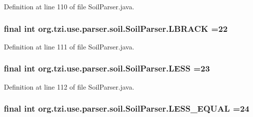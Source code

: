 Definition at line 110 of file Soil\-Parser.\-java.

\hypertarget{classorg_1_1tzi_1_1use_1_1parser_1_1soil_1_1_soil_parser_a7dc5102c33cc1a06d0bba2690db2d42c}{
\subsubsection[{L\-B\-R\-A\-C\-K}]{\setlength{\rightskip}{0pt plus 5cm}final int org.\-tzi.\-use.\-parser.\-soil.\-Soil\-Parser.\-L\-B\-R\-A\-C\-K =22\hspace{0.3cm}{\ttfamily [static]}}}\label{classorg_1_1tzi_1_1use_1_1parser_1_1soil_1_1_soil_parser_a7dc5102c33cc1a06d0bba2690db2d42c}


Definition at line 111 of file Soil\-Parser.\-java.

\hypertarget{classorg_1_1tzi_1_1use_1_1parser_1_1soil_1_1_soil_parser_aedcc44340367e46c0113e5c912cc1c31}{
\subsubsection[{L\-E\-S\-S}]{\setlength{\rightskip}{0pt plus 5cm}final int org.\-tzi.\-use.\-parser.\-soil.\-Soil\-Parser.\-L\-E\-S\-S =23\hspace{0.3cm}{\ttfamily [static]}}}\label{classorg_1_1tzi_1_1use_1_1parser_1_1soil_1_1_soil_parser_aedcc44340367e46c0113e5c912cc1c31}


Definition at line 112 of file Soil\-Parser.\-java.

\hypertarget{classorg_1_1tzi_1_1use_1_1parser_1_1soil_1_1_soil_parser_a9a66b349a665b8dbd65a7855f286718c}{
\subsubsection[{L\-E\-S\-S\-\_\-\-E\-Q\-U\-A\-L}]{\setlength{\rightskip}{0pt plus 5cm}final int org.\-tzi.\-use.\-parser.\-soil.\-Soil\-Parser.\-L\-E\-S\-S\-\_\-\-E\-Q\-U\-A\-L =24\hspace{0.3cm}{\ttfamily [static]}}}\label{classorg_1_1tzi_1_1use_1_1parser_1_1soil_1_1_soil_parser_a9a66b349a665b8dbd65a7855f286718c}



